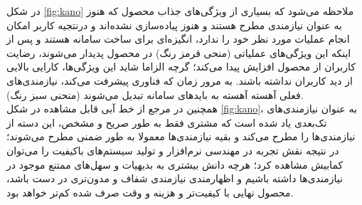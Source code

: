 در شکل
\ref{fig:kano}
ملاحظه می‌شود که بسیاری از ویژگی‌های جذاب محصول که هنوز به عنوان نیازمندی مطرح هستند و هنوز پیاده‌سازی نشده‌اند و درنتجیه کاربر امکان انجام عملیات مورد نظر خود را ندارد، انگیزه‌ای برای ساخت سامانه هستند و پس از اینکه این ویژگی‌های عملیاتی (منحی قرمز رنگ) در محصول پدیدار می‌شوند، رضایت کاربران از محصول افزایش پیدا می‌کند؛ گرچه الزاما شاید این ویژگی‌ها، کارایی بالایی از دید کاربران نداشته باشند. به مرور زمان که فناوری پیشرفت می‌کند، نیازمندی‌های فعلی آهسته آهسته به باید‌های سامانه تبدیل می‌شوند (منحنی سبز رنگ).\\
همچنین در مرجع
\cite{sauerwein_kano_1996}
از خط آبی قابل مشاهده در شکل
\ref{fig:kano}،
به عنوان نیازمندی‌های تک‌بعدی یاد شده است که مشتری فقط به طور صریح و مشخص، این دسته از نیازمندی‌ها را مطرح می‌کند و بقیه نیازمندی‌ها معمولا به طور ضمنی مطرح می‌شوند؛ در نتیجه نقش تجربه در مهندسی نرم‌افزار و تولید سیستم‌های باکیفیت را می‌توان کمابیش مشاهده کرد؛ هرچه دانش بیشتری به بدیهیات و سهل‌های ممتنع موجود در نیازمندی‌ها داشته باشیم و اظهارمندی نیازمندی شفاف و مدون‌تری در دست باشد، محصول نهایی با کیفیت‌تر و هزینه و وقت صرف شده کم‌تر خواهد بود.\\
